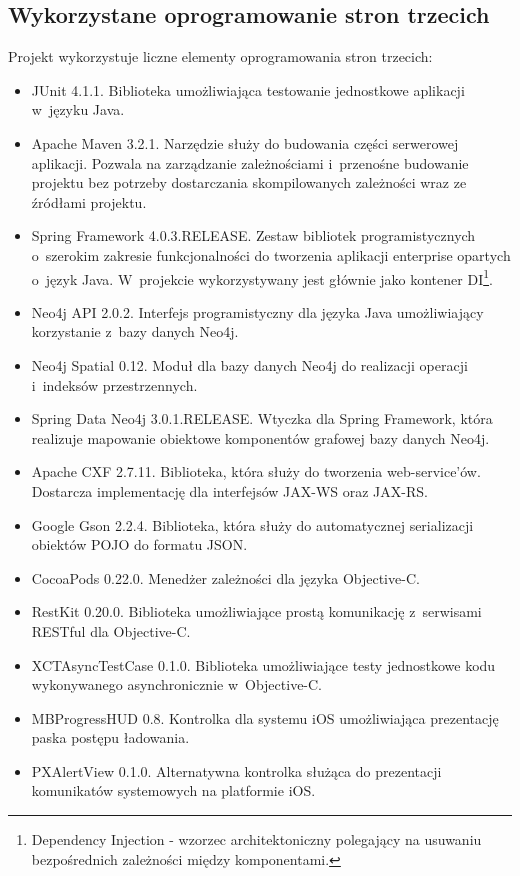 \documentclass[a4paper,12pt]{article}
\begin{document}
	\subsection*{Wykorzystane oprogramowanie stron trzecich}

	Projekt wykorzystuje liczne elementy oprogramowania stron trzecich:

	\begin{itemize}
		\item JUnit 4.1.1. Biblioteka umożliwiająca testowanie jednostkowe aplikacji w~języku Java.
		\item Apache Maven 3.2.1. Narzędzie służy do budowania części serwerowej aplikacji. Pozwala na zarządzanie zależnościami i~przenośne budowanie projektu bez potrzeby dostarczania skompilowanych zależności wraz ze źródłami projektu.
		\item Spring Framework 4.0.3.RELEASE. Zestaw bibliotek programistycznych o~szerokim zakresie funkcjonalności do tworzenia aplikacji enterprise opartych o~język Java. W~projekcie wykorzystywany jest głównie jako kontener DI\footnote{Dependency Injection - wzorzec architektoniczny polegający na usuwaniu bezpośrednich zależności między komponentami.}.
		\item Neo4j API 2.0.2. Interfejs programistyczny dla języka Java umożliwiający korzystanie z~bazy danych Neo4j.
		\item Neo4j Spatial 0.12. Moduł dla bazy danych Neo4j do realizacji operacji i~indeksów przestrzennych. 
		\item Spring Data Neo4j 3.0.1.RELEASE. Wtyczka dla Spring Framework, która realizuje mapowanie obiektowe komponentów grafowej bazy danych Neo4j.
		\item Apache CXF 2.7.11. Biblioteka, która służy do tworzenia web-service'ów. Dostarcza implementację dla interfejsów JAX-WS oraz JAX-RS.
		\item Google Gson 2.2.4. Biblioteka, która służy do automatycznej serializacji obiektów POJO do formatu JSON.
		\item CocoaPods 0.22.0. Menedżer zależności dla języka Objective-C.
		\item RestKit 0.20.0. Biblioteka umożliwiające prostą komunikację z~serwisami RESTful dla Objective-C.
		\item XCTAsyncTestCase 0.1.0. Biblioteka umożliwiające testy jednostkowe kodu wykonywanego asynchronicznie w~Objective-C.
		\item MBProgressHUD 0.8. Kontrolka dla systemu iOS umożliwiająca prezentację paska postępu ładowania.
		\item PXAlertView 0.1.0. Alternatywna kontrolka służąca do prezentacji komunikatów systemowych na platformie iOS.
	\end{itemize}
\end{document}
